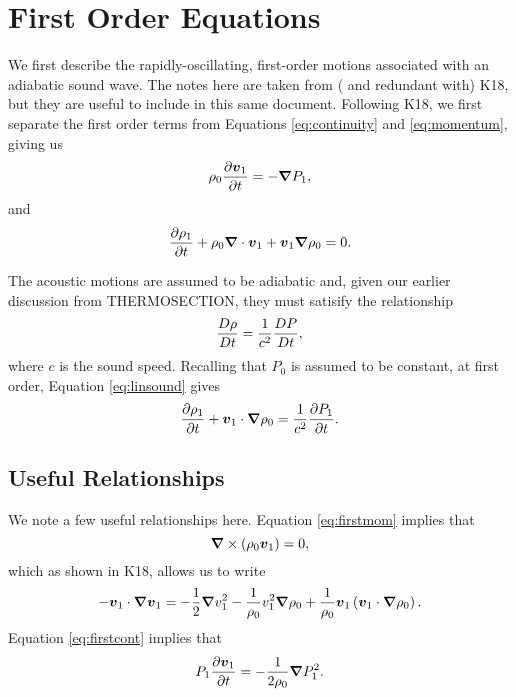 \section{First Order Equations}
We first describe the rapidly-oscillating, first-order motions associated with an adiabatic sound wave. The notes here are taken from ( and redundant with) K18, but they are useful to include in this same document.  Following K18, we first separate the first order terms from Equations \ref{eq:continuity} and \ref{eq:momentum}, giving us
\begin{equation}
\label{eq:firstmom}
\rho_0\frac{\partial\boldsymbol{v}_1}{\partial t} = -\boldsymbol{\nabla} P_1,
\end{equation}
and
\begin{equation}
\label{eq:firstcont}
\frac{\partial\rho_1}{\partial t} + \rho_0\boldsymbol{\nabla}\cdot\boldsymbol{v}_1 + \boldsymbol{v}_1\boldsymbol{\nabla}\rho_0 = 0.
\end{equation}

The acoustic motions are assumed to be adiabatic and, given our earlier discussion from THERMOSECTION, they must satisify the relationship
\begin{equation}
\label{eq:sound}
\frac{D\rho}{Dt} = \frac{1}{c^2}\frac{DP}{Dt},
\end{equation}
where $c$ is the sound speed.   Recalling that $P_0$ is assumed to be constant, at first order, Equation \ref{eq:linsound} gives
\begin{equation}
\label{eq:linsound}
\frac{\partial\rho_1}{\partial t} +\boldsymbol{v}_1\cdot\boldsymbol{\nabla}\rho_0 = \frac{1}{c^2}\frac{\partial P_1}{\partial t}.
\end{equation}

\subsection{Useful Relationships}
We note a few useful relationships here.  Equation \ref{eq:firstmom} implies that 
\begin{equation}
\label{eq:firstcurl}
\boldsymbol{\nabla}\times\left(\rho_0\boldsymbol{v}_1\right) = 0,
\end{equation}
which as shown in K18, allows us to write
\begin{equation}
\label{eq:firstgrad}
-\boldsymbol{v}_1\cdot\boldsymbol{\nabla}\boldsymbol{v}_1 = -\frac{1}{2}\boldsymbol{\nabla} v_1^2 -\frac{1}{\rho_0}v_1^2\boldsymbol{\nabla}\rho_0 +\frac{1}{\rho_0}\boldsymbol{v}_1\left(\boldsymbol{v}_1\cdot\boldsymbol{\nabla}\rho_0\right).
\end{equation}
Equation \ref{eq:firstcont} implies that
\begin{equation}
\label{eq:firstdt}
P_1\frac{\partial\boldsymbol{v}_1}{\partial t} = -\frac{1}{2\rho_0}\boldsymbol{\nabla} P_1^2.
\end{equation}


